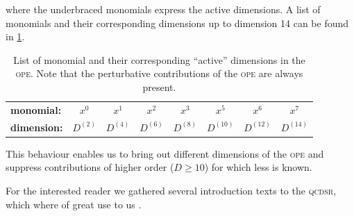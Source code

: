 \documentclass[../../index.tex]{subfiles}
\begin{document}
where the underbraced monomials express the active dimensions. A list of
monomials and their corresponding dimensions up to dimension 14 can be found in
\cref{table:monomialDimensions}.
\begin{table}
  \centering
  \begin{tabular}{l|ccccccc}
    \toprule
    \textbf{monomial:} & \(x^0\) & \(x^1\) & \(x^2\) & \(x^3\) & \(x^5\) & \(x^6\) & \(x^7\)\\
    \textbf{dimension:} & \(D^{(2)}\) & \(D^{(4)}\) & \(D^{(6)}\) & \(D^{(8)}\) & \(D^{(10)}\) & \(D^{(12)}\) & \(D^{(14)}\)\\
    \bottomrule 
  \end{tabular}
  \caption{List of monomial and their corresponding ``active'' dimensions in the
    \textsc{ope}. Note that the perturbative contributions of the \textsc{ope}
    are always present.}
  \label{table:monomialDimensions}
\end{table}
This behaviour enables us to bring out different dimensions of the \textsc{ope}
and suppress contributions of higher order (\(D\geq10\)) for which less is
known.


For the interested reader we gathered several introduction texts to the
\textsc{qcdsr}, which where of great use to us
\cite{Narison1989,Rafael1997,Colangelo2000,Dominguez2013}.
\end{document}
